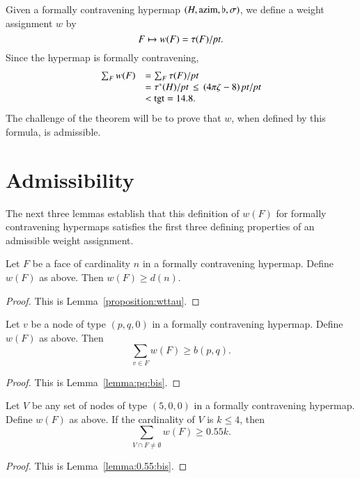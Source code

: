 Given a formally contravening hypermap $(H,{\operatorname{azim}},\flat,\sigma)$, we
define a weight assignment $w$ by
    $$F \mapsto w(F) = \tau(F)/\hbox{\it pt}.$$
Since the hypermap is formally contravening,
    $$
    \begin{array}{lll}
    \sum_F w(F) &= \sum_F \tau(F)/\hbox{\it pt} \\
            &= \tau^*(H)/\hbox{\it pt}\,\le\,(4\pi\zeta-8)\,\hbox{\it pt}/\hbox{\it pt} \\
        &< {\operatorname{tgt}}=14.8.
    \end{array}
    $$
The challenge of the theorem will be to prove that $w$, when
defined by this formula, is admissible.

\section{Admissibility}
\label{sec:admissibility}

The next three lemmas establish that this definition of $w(F)$ for
formally contravening hypermaps satisfies the first three defining
properties of an admissible weight assignment.

\begin{lemma}  Let $F$ be a face of cardinality $n$ in a formally contravening hypermap.
Define $w(F)$ as above. Then
        $w(F) \ge d(n)$.
\end{lemma}

\begin{proof} This is Lemma~\ref{proposition:wttau}.
\end{proof}

\begin{lemma} Let $v$ be a node of type $(p,q,0)$ in a
formally contravening hypermap.  Define $w(F)$ as above. Then
        $$\sum_{v\in F} w(F) \ge b(p,q).$$
\end{lemma}


\begin{proof} This is Lemma~\ref{lemma:pq:bis}.
\end{proof}

\begin{lemma} Let $V$ be any set of nodes of type $(5,0,0)$ in a
formally contravening hypermap.  Define $w(F)$ as above.
        If the cardinality of $V$ is $k\le 4$,
        then
        $$\sum_{V\cap F\ne\emptyset} w(F) \ge 0.55 k.$$
\end{lemma}

\begin{proof} This is Lemma~\ref{lemma:0.55:bis}.
\end{proof}


